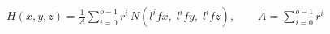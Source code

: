 \documentclass[border=6pt]{standalone}
\begin{document}
\color{white}
\(\displaystyle
H(x,y,z)=
\frac{1}{A}
\sum_{i=0}^{o-1}
r^i\,
N\!\left(l^i f x,\;l^i f y,\;l^i f z\right),
\qquad
A=\sum_{i=0}^{o-1} r^i
\)
\end{document}
